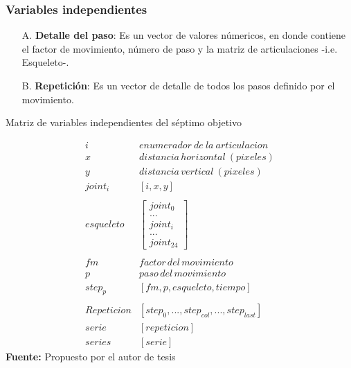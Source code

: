 \subsubsection{Variables independientes} \label{vr:7oi:indep}
\begin{enumerate}
	\item[A.] \textbf{Detalle del paso}: Es un vector de valores n\'umericos, en donde contiene el factor de movimiento, n\'umero de paso y la matriz de articulaciones -i.e. Esqueleto-. 
	\item[B.] \textbf{Repetici\'on}:  Es un vector de detalle de todos los pasos definido por el movimiento.
\end{enumerate}	
\begin{formula}[h]
	\centering
	\caption{Matriz de variables independientes del s\'eptimo objetivo}
	\label{frm:vecEtiq}
	\begin{equation}
\begin{matrix}
i & enumerador\: de\: la\: articulacion \\ 
x & distancia\, horizontal \: (pixeles) \\ 
y & distancia\, vertical\: (pixeles) \\ 
joint_{i}& [i,x,y] \\ 
 & \\ 
esqueleto & \begin{bmatrix}
joint_{0} \\ 
... \\ 
joint_{i}\\ 
... \\ 
joint_{24}
\end{bmatrix}  \\ 
 & \\ 
fm & factor \, del \, movimiento \\ 
p  & paso \, del \,movimiento \\ 
step_{p}  & [fm,p,esqueleto, tiempo] \\
 & \\ 
Repeticion & [step_{0}, ...,  step_{col}, ..., step_{last}] \\
serie & [repeticion] \\
series & [serie]
\end{matrix}
	\end{equation}
	\textbf{Fuente:} Propuesto por el autor de tesis
\end{formula}  
\medbreak
